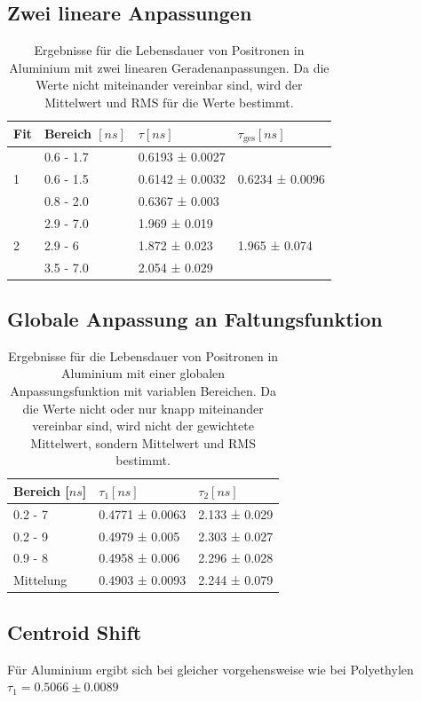 \documentclass[a4paper,12pt]{article}
\begin{document}
\subsection{Zwei lineare Anpassungen}
\begin{table}[h]
	\begin{tabular}{l |l l ||l}
			Fit& Bereich $[\si{ns}]$ & $τ [\si{ns}]$ & $τ_\text{ges} [\si{ns}]$ \\
		\hline
		\multirow{3}{*}{1} & 0.6 - 1.7 &  0.6193 ± 0.0027   &\multirow{3}{*}{  0.6234 ± 0.0096}\\
	 & 0.6 - 1.5 &  0.6142 ± 0.0032   &\\
	 & 0.8 - 2.0 &  0.6367 ± 0.003   &\\
	 \hline
	 \multirow{3}{*}{2}  & 2.9 - 7.0 &  1.969 ± 0.019   &\multirow{3}{*}{1.965 ± 0.074 }\\
	 & 2.9 - 6 &  1.872 ± 0.023   &\\
	 & 3.5 - 7.0 &  2.054 ± 0.029   &
	\end{tabular}
	\centering
	\caption{Ergebnisse für die Lebensdauer von Positronen in Aluminium mit zwei linearen
		Geradenanpassungen. Da die Werte nicht miteinander vereinbar sind, wird der Mittelwert und
	RMS für die Werte bestimmt.}
	\label{tab:linearPoly}
\end{table}
\subsection{Globale Anpassung an Faltungsfunktion}

\begin{table}[h]
	\begin{tabular}{l |l l}
		Bereich [$\si{ns}$] & $τ_1 [\si{ns}]$ & $τ_2 [\si{ns}]$ \\
		\hline
0.2 - 7 &  0.4771 ± 0.0063   &  2.133 ± 0.029  \\
0.2 - 9 &  0.4979 ± 0.005   &  2.303 ± 0.027  \\
0.9 - 8 &  0.4958 ± 0.006   &  2.296 ± 0.028  \\
		\hline
		\hline
		Mittelung & 0.4903 ± 0.0093 & 2.244 ± 0.079
	\end{tabular}
	\centering
	\caption{Ergebnisse für die Lebensdauer von Positronen in Aluminium mit einer globalen
	Anpassungsfunktion mit variablen Bereichen. Da die Werte nicht oder nur knapp miteinander
		vereinbar sind, wird nicht der gewichtete Mittelwert, sondern Mittelwert und RMS bestimmt.}
	\label{tab:globalPoly}
\end{table}
\subsection{Centroid Shift}
Für Aluminium ergibt sich bei gleicher vorgehensweise wie bei Polyethylen $τ_1 = 0.5066 \pm 0.0089$ 
\end{document}
